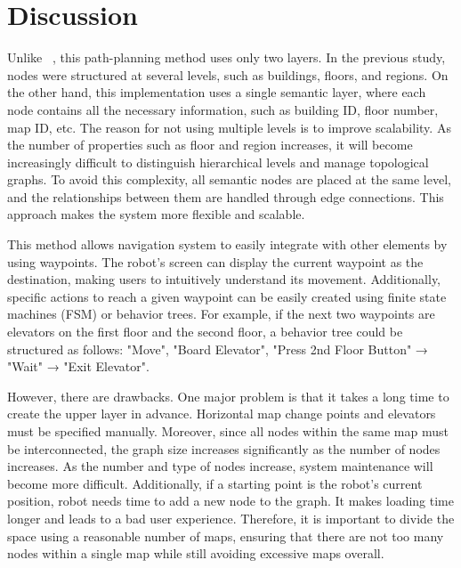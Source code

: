 \documentclass[en]{snu-cse-bsc-thesis}
\begin{document}
\section{Discussion}\label{sec:Discussion}
Unlike ~\cite{MultiStoreyBuildingNavigation}, this path-planning method uses only two layers. 
In the previous study, nodes were structured at several levels, such as buildings, floors, and regions.
On the other hand, this implementation uses a single semantic layer, where each node contains all the necessary information, such as building ID, floor number, map ID, etc. 
The reason for not using multiple levels is to improve scalability. 
As the number of properties such as floor and region increases, it will become increasingly difficult to distinguish hierarchical levels and manage topological graphs.
To avoid this complexity, all semantic nodes are placed at the same level, and the relationships between them are handled through edge connections. 
This approach makes the system more flexible and scalable.

This method allows navigation system to easily integrate with other elements by using waypoints. 
The robot's screen can display the current waypoint as the destination, making users to intuitively understand its movement. 
Additionally, specific actions to reach a given waypoint can be easily created using finite state machines (FSM) or behavior trees. 
For example, if the next two waypoints are elevators on the first floor and the second floor, a behavior tree could be structured as follows: "Move", "Board Elevator", "Press 2nd Floor Button" → "Wait" → "Exit Elevator".

However, there are drawbacks. One major problem is that it takes a long time to create the upper layer in advance. 
Horizontal map change points and elevators must be specified manually. 
Moreover, since all nodes within the same map must be interconnected, the graph size increases significantly as the number of nodes increases.
As the number and type of nodes increase, system maintenance will become more difficult. 
Additionally, if a starting point is the robot's current position, robot needs time to add a new node to the graph. 
It makes loading time longer and leads to a bad user experience. 
Therefore, it is important to divide the space using a reasonable number of maps, ensuring that there are not too many nodes within a single map while still avoiding excessive maps overall.
\end{document}
